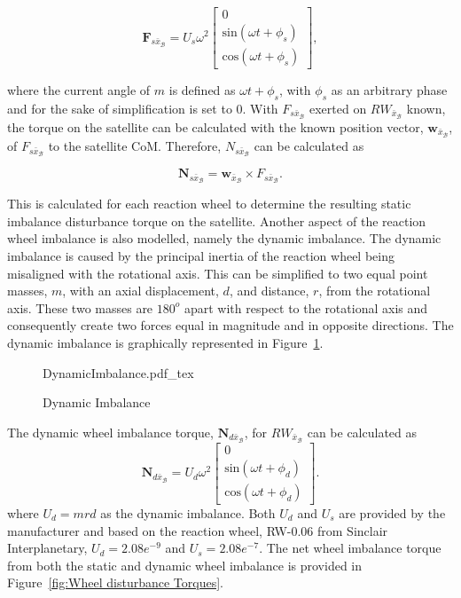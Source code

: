 \begin{equation}
\mathbf{F}_{s\bar{x}_\mathcal{B}} = U_s\omega^2 \begin{bmatrix} 0 \\ \text{sin}(\omega t + \phi_s) \\ \text{cos}(\omega t + \phi_s)\end{bmatrix},
\end{equation}

where the current angle of $m$ is defined as $\omega t + \phi_s$, with $\phi_s$ as an arbitrary phase and for the sake of simplification is set to $0$. With $F_{s\bar{x}_\mathcal{B}}$ exerted on $RW_{\bar{x}_\mathcal{B}}$ known, the torque on the satellite can be calculated with the known position vector, $\mathbf{w}_{\bar{x}_\mathcal{B}}$, of $F_{s\bar{x}_\mathcal{B}}$ to the satellite CoM. Therefore, $N_{s\bar{x}_\mathcal{B}}$ can be calculated as

\begin{equation}
\mathbf{N}_{s\bar{x}_\mathcal{B}} = \mathbf{w}_{\bar{x}_\mathcal{B}} \times F_{s\bar{x}_\mathcal{B}}.
\end{equation}

This is calculated for each reaction wheel to determine the resulting static imbalance disturbance torque on the satellite. Another aspect of the reaction wheel imbalance is also modelled, namely the dynamic imbalance. The dynamic imbalance is caused by the principal inertia of the reaction wheel being misaligned with the rotational axis. This can be simplified to two equal point masses, $m$, with an axial displacement, $d$, and distance, $r$, from the rotational axis. These two masses are $\num{180}^o$ apart with respect to the rotational axis and consequently create two forces equal in magnitude and in opposite directions. The dynamic imbalance is graphically represented in Figure~\ref{fig:DynamicImbalance}.

\begin{figure}[!htb]
	\centering
	\def\svgwidth{10cm}
	{DynamicImbalance.pdf_tex}
	\caption{Dynamic Imbalance}
	\label{fig:DynamicImbalance}
\end{figure}

The dynamic wheel imbalance torque, $\mathbf{N}_{d\bar{x}_\mathcal{B}}$, for $RW_{\bar{x}_\mathcal{B}}$ can be calculated as 
\begin{equation}
\mathbf{N}_{d\bar{x}_\mathcal{B}} = U_d\omega^2 \begin{bmatrix} 0 \\ \text{sin}(\omega t + \phi_d) \\ \text{cos}(\omega t + \phi_d)\end{bmatrix}.
\end{equation}
where $U_d = mrd$ as the dynamic imbalance. Both $U_d$ and $U_s$ are provided by the manufacturer and based on the reaction wheel, RW-0.06 from Sinclair Interplanetary, $U_d = 2.08e^{-9}$ and $U_s = 2.08e^{-7}$. The net wheel imbalance torque from both the static and dynamic wheel imbalance is provided in Figure~\ref{fig:Wheel disturbance Torques}.

